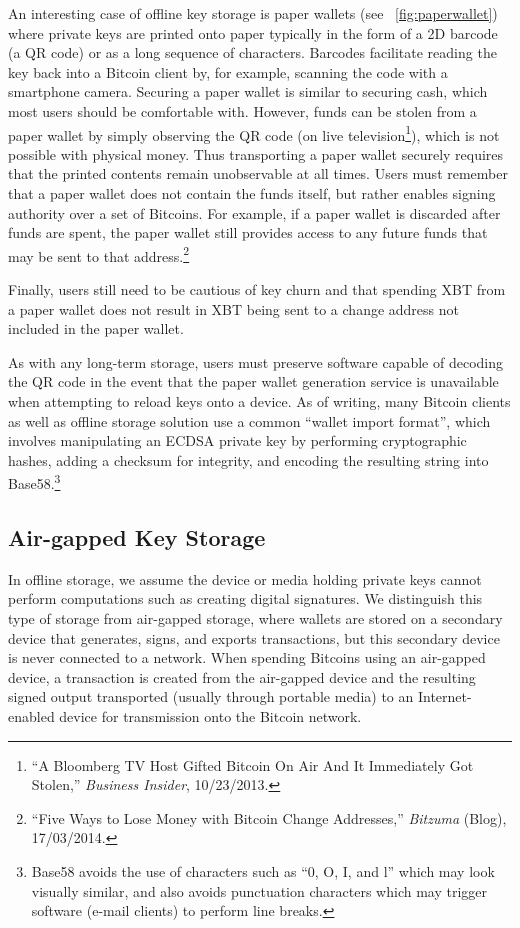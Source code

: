 An interesting case of offline key storage is paper wallets (see ~\autoref{fig:paperwallet})
where private keys are printed onto paper typically in the form of a 2D barcode (\eg a QR code) or as a long sequence of characters. Barcodes facilitate reading the key back into a Bitcoin client by, for example, scanning the code with a smartphone camera. Securing a paper wallet is similar to securing cash, which most users should be comfortable with. However, funds can be stolen from a paper wallet by simply observing the QR code (\eg on live television\footnote{``A Bloomberg TV Host Gifted Bitcoin On Air And It Immediately Got Stolen,'' \textit{Business Insider}, 10/23/2013.}), which is not possible with physical money. Thus transporting a paper wallet securely requires that the printed contents remain unobservable at all times.  Users must remember that a paper wallet does not contain the funds itself, but rather enables signing authority over a set of Bitcoins. For example, if a paper wallet is discarded after funds are spent, the paper wallet still provides access to any future funds that may be sent to that address.\footnote{``Five Ways to Lose Money with Bitcoin Change Addresses,'' \textit{Bitzuma} (Blog), 17/03/2014.} 

Finally, users still need to be cautious of key churn and that spending XBT from a paper wallet does not result in XBT being sent to a change address not included in the paper wallet. 

As with any long-term storage, users must preserve software capable of decoding the QR code in the event that the paper wallet generation service is unavailable when attempting to reload keys onto a device. As of writing, many Bitcoin clients as well as offline storage solution use a common ``wallet import format'', which involves manipulating an ECDSA private key by performing cryptographic hashes, adding a checksum for integrity, and encoding the resulting string into Base58.\footnote{Base58 avoids the use of characters such as ``0, O, I, and l'' which may look visually similar, and also avoids punctuation characters which may trigger software (\eg e-mail clients) to perform line breaks.}

\subsection{Air-gapped Key Storage}
In offline storage, we assume the device or media holding private keys cannot perform computations such as creating digital signatures. We distinguish this type of storage from air-gapped storage, where wallets are stored on a secondary device that generates, signs, and exports transactions, but this secondary device is never connected to a network. When spending Bitcoins using an air-gapped device, a transaction is created from the air-gapped device and the resulting signed output transported (usually through portable media) to an Internet-enabled device for transmission onto the Bitcoin network. 

